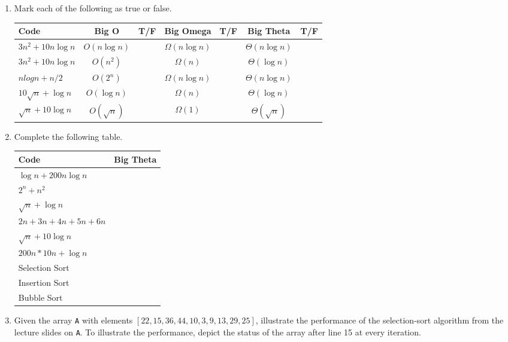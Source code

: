 \documentclass[11pt]{article}
\begin{document}
\begin{enumerate}
    \item Mark each of the following as true or false.
    \begin{center}
        \begin{tabular}{l | c | c | c | c | c | c}
            Code & Big O & T/F & Big Omega & T/F & Big Theta & T/F \\ \hline
            $3 n^2 + 10 n \log n$ & $O(n \log n)$ & & $\Omega(n \log n)$ & & $\Theta(n \log n)$ & \\ \hline
            $3 n^2 + 10 n \log n$ & $O(n^2)$ & & $\Omega(n)$ & & $\Theta(\log n)$ & \\ \hline
            $n log n + n/2$ & $O(2^n)$ & & $\Omega(n \log n)$ & & $\Theta(n \log n)$ & \\ \hline
            $10 \sqrt{n} + \log n$ & $O(\log n)$ & & $\Omega(n)$ & & $\Theta(\log n)$ & \\ \hline
            $\sqrt{n} + 10 \log n$ & $O(\sqrt n)$ & & $\Omega(1)$ & & $\Theta(\sqrt n)$ & \\ \hline
        \end{tabular}
    \end{center}
    \item Complete the following table.
    \begin{center}
        \begin{tabular}{l | c }
            Code & Big Theta \\ \hline
            $\log n + 200 n \log n$ & \\ \hline
            $2^n + n^2$ & \\ \hline
            $\sqrt n + \log n$ & \\ \hline
            $2n + 3n + 4n + 5n + 6n$ & \\ \hline
            $\sqrt{n} + 10 \log n$ & \\ \hline
            $200 n * 10 n + \log n$ & \\ \hline
            Selection Sort & \\ \hline
            Insertion Sort & \\ \hline
            Bubble Sort & \\ \hline
        \end{tabular}
    \end{center}
    
    \item Given the array \verb|A| with elements $[22, 15, 36, 44, 10, 3, 9, 13, 29, 25]$, illustrate the performance of the selection-sort algorithm from the lecture slides on \verb|A|. To illustrate the performance, depict the status of the array after line 15 at every iteration.
    

\end{enumerate}
\end{document}
